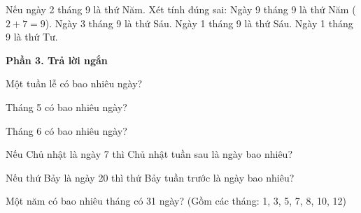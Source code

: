\begin{ex} %
Nếu ngày 2 tháng 9 là thứ Năm. Xét tính đúng sai:
\choiceTF
{\True Ngày 9 tháng 9 là thứ Năm ($2 + 7 = 9$).}
{\True Ngày 3 tháng 9 là thứ Sáu.}
{Ngày 1 tháng 9 là thứ Sáu.}
{\True Ngày 1 tháng 9 là thứ Tư.}
\end{ex}

\textbf{Phần 3. Trả lời ngắn}

\begin{ex} %
Một tuần lễ có bao nhiêu ngày?
\end{ex}

\begin{ex} %
Tháng 5 có bao nhiêu ngày?
\end{ex}

\begin{ex} %
Tháng 6 có bao nhiêu ngày?
\end{ex}

\begin{ex} %
Nếu Chủ nhật là ngày 7 thì Chủ nhật tuần sau là ngày bao nhiêu?
\end{ex}

\begin{ex} %
Nếu thứ Bảy là ngày 20 thì thứ Bảy tuần trước là ngày bao nhiêu?
\end{ex}

\begin{ex} %
Một năm có bao nhiêu tháng có 31 ngày? (Gồm các tháng: 1, 3, 5, 7, 8, 10, 12)
\end{ex}

